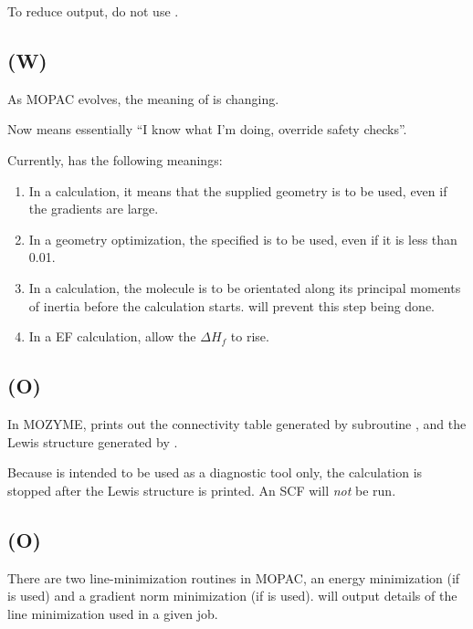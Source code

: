 To reduce output, do not use .


\subsection*{ (W)}
As MOPAC evolves, the meaning of  is changing.

Now  means essentially ``I know what I'm  doing,  override  safety
checks''.

Currently,  has the following meanings:
\begin{enumerate}
\item In a  calculation, it means that the supplied  geometry  is
            to be used, even if the gradients are large.

\item{}
In a geometry optimization, the specified  is to  be  used,
even if it is less than 0.01.

\item In a  calculation, the molecule is to be  orientated  along
its  principal moments of inertia before the calculation starts.
 will prevent this step being done.
\item In a EF calculation, allow the $\Delta H_f$ to rise.

\end{enumerate}

\subsection*{ (O)}
In MOZYME, prints out the connectivity table generated by subroutine ,
and the Lewis structure generated by .

Because  is intended to be used as a diagnostic tool only, the calculation is stopped after the Lewis structure is printed.  An SCF will {\em not} be run.


\subsection*{ (O)}
There  are  two  line-minimization  routines  in  MOPAC,  an  energy
minimization (if  is used) and  a  gradient  norm  minimization
(if  is used).     will output
details of the line minimization used in a given job.





